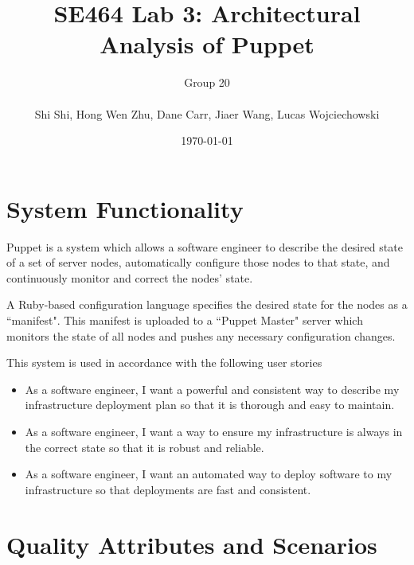 \documentclass[a4paper]{article}
\title{SE464 Lab 3: Architectural Analysis of Puppet}
\author{
  Group 20 \\ \\
  Shi Shi, Hong Wen Zhu, Dane Carr, Jiaer Wang, Lucas Wojciechowski
}
\date{\today}
\begin{document}
\maketitle

\section{System  Functionality} %


Puppet is a system which allows a software engineer to describe the desired state of a set of server nodes, automatically configure those nodes to that state, and continuously monitor and correct the nodes' state.

A Ruby-based configuration language specifies the desired state for the nodes as a ``manifest". This manifest is uploaded to a ``Puppet Master" server which monitors the state of all nodes and pushes any necessary configuration changes.

This system is used in accordance with the following user stories
\begin{itemize}
\item As a software engineer, I want a powerful and consistent way to describe my infrastructure deployment plan so that it is thorough and easy to maintain.
\item As a software engineer, I want a way to ensure my infrastructure is always in the correct state so that it is robust and reliable.
\item As a software engineer, I want an automated way to deploy software to my infrastructure so that deployments are fast and consistent.
\end{itemize}

\section{Quality Attributes and Scenarios} %


\end{document}
